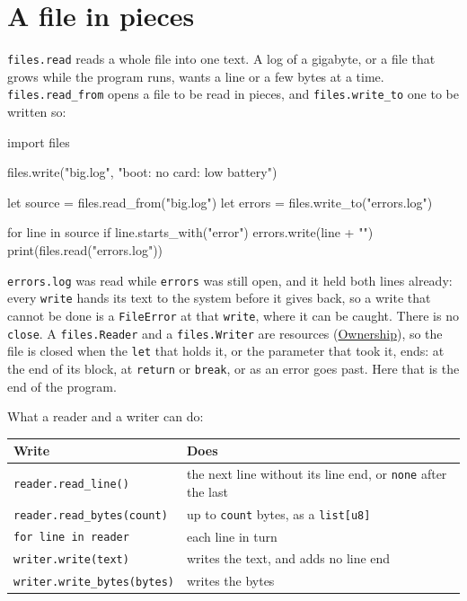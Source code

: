 \section{A file in pieces}

\verb|files.read| reads a whole file into one text. A log of a
gigabyte, or a file that grows while the program runs, wants a line
or a few bytes at a time. \verb|files.read_from| opens a file to be
read in pieces, and \verb|files.write_to| one to be written so:

\begin{zeno}[file=errors.zeno, dir=pieces]
import files

files.write("big.log", "boot\nerror: no card\nready\nerror: low battery\n")

let source = files.read_from("big.log")
let errors = files.write_to("errors.log")

for line in source {
    if line.starts_with("error") {
        errors.write(line + "\n")
    }
}
print(files.read("errors.log"))
\end{zeno}

\verb|errors.log| was read while \verb|errors| was still open, and it
held both lines already: every \verb|write| hands its text to the
system before it gives back, so a write that cannot be done is a
\verb|FileError| at that \verb|write|, where it can be caught. There
is no \verb|close|. A \verb|files.Reader| and a \verb|files.Writer|
are resources (\hyperref[ch-ownership]{Ownership}), so the file is
closed when the \verb|let| that holds it, or the parameter that took
it, ends: at the end of its block, at \verb|return| or \verb|break|,
or as an error goes past. Here that is the end of the program.

What a reader and a writer can do:

\begin{center}
\begin{tabular}{ll}
\toprule
Write & Does \\
\midrule
\verb|reader.read_line()| & the next line without its line end, or \verb|none| after the last \\
\verb|reader.read_bytes(count)| & up to \verb|count| bytes, as a \verb|list[u8]| \\
\verb|for line in reader| & each line in turn \\
\verb|writer.write(text)| & writes the text, and adds no line end \\
\verb|writer.write_bytes(bytes)| & writes the bytes \\
\bottomrule
\end{tabular}
\end{center}

